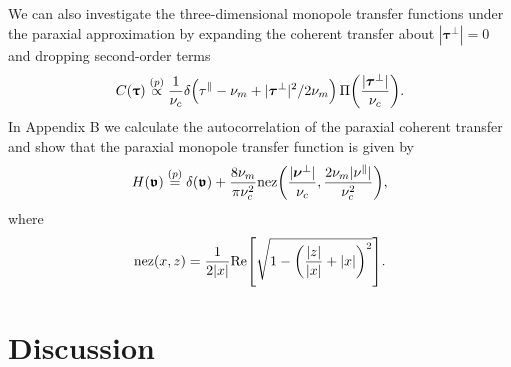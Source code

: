 \documentclass[]{osa-article}
\let\originalleft\left
\let\originalright\right
\renewcommand{\left}{\mathopen{}\mathclose\bgroup\originalleft}
\renewcommand{\right}{\aftergroup\egroup\originalright}
\newcommand{\mypar}{\parallel}
\providecommand{\bs}[1]{\boldsymbol{#1}}
\providecommand{\bv}{\boldsymbol{\mathfrak{v}}}
\providecommand{\bvperp}{\bs{\nu}^{\bot}}
\providecommand{\bvpar}{\nu^{\parallel}}
\providecommand{\bt}{\bs{\uptau}}
\providecommand{\btperp}{\bs{\tau}^{\bot}}
\providecommand{\btpar}{\tau^{\mypar}}
\providecommand{\eqp}{\stackrel{(p)}{=}}
\providecommand{\propp}{\stackrel{(p)}{\propto}}
\begin{document}
We can also investigate the three-dimensional monopole transfer functions under the paraxial approximation by expanding the coherent transfer about $|\btperp| = 0$ and dropping second-order terms
\begin{align}
  C(\bt) \propp \frac{1}{\nu_c}\delta\left(\btpar - \nu_m + |\btperp|^2/2\nu_m\right)\,\Pi\left(\frac{|\btperp|}{\nu_c}\right).
\end{align}
In Appendix B we calculate the autocorrelation of the paraxial coherent transfer and show that the paraxial monopole transfer function is given by
\begin{align}
  H(\bv) \eqp \delta(\bv) + \frac{8\nu_m}{\pi\nu_c^2}\text{nez}\left(\frac{|\bvperp|}{\nu_c}, \frac{2\nu_m|\bvpar|}{\nu_c^2}\right),
\end{align}
where
\begin{align}
 \text{nez}(x, z) = \frac{1}{2|x|}\text{Re}\left[\sqrt{1 - \left(\frac{|z|}{|x|} + |x|\right)^2}\right].
\end{align}





\section{Discussion}
\end{document}

